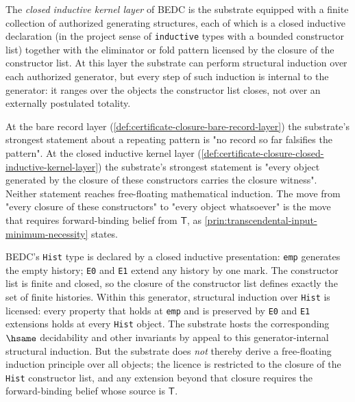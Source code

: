 \begin{definition}
\label{def:certificate-closure-closed-inductive-kernel-layer}
The \emph{closed inductive kernel layer} of BEDC is the substrate equipped with a finite collection of authorized generating structures, each of which is a closed inductive declaration (in the project sense of \texttt{inductive} types with a bounded constructor list) together with the eliminator or fold pattern licensed by the closure of the constructor list. At this layer the substrate can perform structural induction over each authorized generator, but every step of such induction is internal to the generator: it ranges over the objects the constructor list closes, not over an externally postulated totality.
\end{definition}

\begin{principle}
\label{prin:certificate-closure-two-layers-two-behaviours}
At the bare record layer (\autoref{def:certificate-closure-bare-record-layer}) the substrate's strongest statement about a repeating pattern is "no record so far falsifies the pattern". At the closed inductive kernel layer (\autoref{def:certificate-closure-closed-inductive-kernel-layer}) the substrate's strongest statement is "every object generated by the closure of these constructors carries the closure witness". Neither statement reaches free-floating mathematical induction. The move from "every closure of these constructors" to "every object whatsoever" is the move that requires forward-binding belief from $\mathsf{T}$, as \autoref{prin:transcendental-input-minimum-necessity} states.
\end{principle}

\begin{example}
\label{ex:certificate-closure-hist-as-authorized-generator}
BEDC's \texttt{Hist} type is declared by a closed inductive presentation: \texttt{emp} generates the empty history; \texttt{E0} and \texttt{E1} extend any history by one mark. The constructor list is finite and closed, so the closure of the constructor list defines exactly the set of finite histories. Within this generator, structural induction over \texttt{Hist} is licensed: every property that holds at \texttt{emp} and is preserved by \texttt{E0} and \texttt{E1} extensions holds at every \texttt{Hist} object. The substrate hosts the corresponding $\hsame$ decidability and other invariants by appeal to this generator-internal structural induction. But the substrate does \emph{not} thereby derive a free-floating induction principle over all objects; the licence is restricted to the closure of the \texttt{Hist} constructor list, and any extension beyond that closure requires the forward-binding belief whose source is $\mathsf{T}$.
\end{example}

